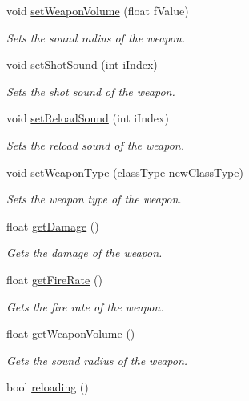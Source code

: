 \begin{DoxyCompactItemize}
void \hyperlink{class_weapon_ac54bf0fb4b7ba439d38a22e6e8c203ed}{set\+Weapon\+Volume} (float f\+Value)
\begin{DoxyCompactList}\small\item\em Sets the sound radius of the weapon. \end{DoxyCompactList}\item 
void \hyperlink{class_weapon_afef061744cc1013fa5e5f06a7573431e}{set\+Shot\+Sound} (int i\+Index)
\begin{DoxyCompactList}\small\item\em Sets the shot sound of the weapon. \end{DoxyCompactList}\item 
void \hyperlink{class_weapon_a30e95664d9571a9e0b614e662466933e}{set\+Reload\+Sound} (int i\+Index)
\begin{DoxyCompactList}\small\item\em Sets the reload sound of the weapon. \end{DoxyCompactList}\item 
void \hyperlink{class_weapon_a9a2ff18fd4086fc1e0dbe1d98bcf16db}{set\+Weapon\+Type} (\hyperlink{_weapon_8h_ab84a9103ee8e782337e098ae19af7a29}{class\+Type} new\+Class\+Type)
\begin{DoxyCompactList}\small\item\em Sets the weapon type of the weapon. \end{DoxyCompactList}\item 
float \hyperlink{class_weapon_afa2f795037346203262b1dbf4c540a11}{get\+Damage} ()
\begin{DoxyCompactList}\small\item\em Gets the damage of the weapon. \end{DoxyCompactList}\item 
float \hyperlink{class_weapon_af088a7a4208b4b7d7ce8824c8ae73374}{get\+Fire\+Rate} ()
\begin{DoxyCompactList}\small\item\em Gets the fire rate of the weapon. \end{DoxyCompactList}\item 
float \hyperlink{class_weapon_a35778cd30d27e461e601cefce101c680}{get\+Weapon\+Volume} ()
\begin{DoxyCompactList}\small\item\em Gets the sound radius of the weapon. \end{DoxyCompactList}\item 
bool \hyperlink{class_weapon_a5e3a65e780892db5b09601292ae59a59}{reloading} ()

\end{DoxyCompactItemize}
